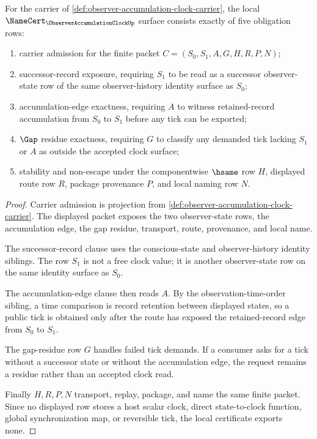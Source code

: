 \begin{theorem}
\label{thm:observer-accumulation-clock-namecert-obligations}
For the carrier of \autoref{def:observer-accumulation-clock-carrier}, the local $\NameCert_{\ObserverAccumulationClockUp}$ surface consists exactly of five obligation rows:
\begin{enumerate}
\item carrier admission for the finite packet $C=(S_0,S_1,A,G,H,R,P,N)$;
\item successor-record exposure, requiring $S_1$ to be read as a successor observer-state row of the same observer-history identity surface as $S_0$;
\item accumulation-edge exactness, requiring $A$ to witness retained-record accumulation from $S_0$ to $S_1$ before any tick can be exported;
\item $\Gap$ residue exactness, requiring $G$ to classify any demanded tick lacking $S_1$ or $A$ as outside the accepted clock surface;
\item stability and non-escape under the componentwise $\hsame$ row $H$, displayed route row $R$, package provenance $P$, and local naming row $N$.
\end{enumerate}
\end{theorem}
\begin{proof}
Carrier admission is projection from \autoref{def:observer-accumulation-clock-carrier}. The displayed packet exposes the two observer-state rows, the accumulation edge, the gap residue, transport, route, provenance, and local name.

The successor-record clause uses the conscious-state and observer-history identity siblings. The row $S_1$ is not a free clock value; it is another observer-state row on the same identity surface as $S_0$.

The accumulation-edge clause then reads $A$. By the observation-time-order sibling, a time comparison is record retention between displayed states, so a public tick is obtained only after the route has exposed the retained-record edge from $S_0$ to $S_1$.

The gap-residue row $G$ handles failed tick demands. If a consumer asks for a tick without a successor state or without the accumulation edge, the request remains a residue rather than an accepted clock read.

Finally $H,R,P,N$ transport, replay, package, and name the same finite packet. Since no displayed row stores a host scalar clock, direct state-to-clock function, global synchronization map, or reversible tick, the local certificate exports none.
\end{proof}


